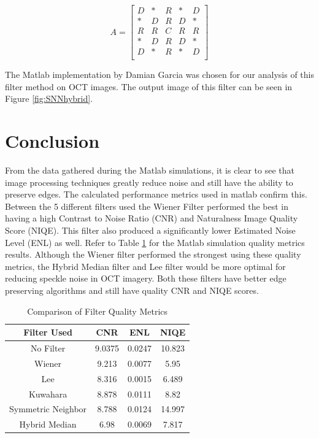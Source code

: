 \documentclass[%
reprint,
showpacs,preprintnumbers,
bibnotes,
amsmath,amssymb,
aps,
pra,
]{revtex4-1}
\begin{document}
$$
A =
\begin{bmatrix}
D & * & R & * & D\\
* & D & R & D & *\\
R & R & C & R & R\\
* & D & R & D & *\\
D & * & R & * & D\\
\end{bmatrix}
$$



The Matlab implementation by Damian Garcia was chosen for our analysis of this filter method on OCT images\cite{garcia_hybrid_2010}. The output image of this filter can be seen in Figure \ref{fig:SNNhybrid}.
\section{\label{sec:level1} Conclusion}
From the data gathered during the Matlab simulations, it is clear to see that image processing techniques greatly reduce noise and still have the ability to preserve edges. The calculated performance metrics used in matlab confirm this. Between the 5 different filters used the Wiener Filter performed the best in having a high Contrast to Noise Ratio (CNR) and Naturalness Image Quality Score (NIQE). This filter also produced a significantly lower Estimated Noise Level (ENL) as well. Refer to Table \ref{tab:compare} for the Matlab simulation quality metrics results. Although the Wiener filter performed the strongest using these quality metrics, the Hybrid Median filter and Lee filter would be more optimal for reducing speckle noise in OCT imagery. Both these filters have better edge preserving algorithms and still have quality CNR and NIQE scores.

\begin{table}[]
  \begin{tabular}{|c|c|c|c|}
    \hline
    Filter Used & CNR & ENL & NIQE \\
    \hline
    No Filter & 9.0375 & 0.0247 & 10.823  \\
    \hline
    Wiener & 9.213 & 0.0077 & 5.95 \\
    \hline
    Lee & 8.316 & 0.0015 & 6.489 \\
    \hline
    Kuwahara & 8.878 & 0.0111 & 8.82 \\
    \hline
    Symmetric Neighbor & 8.788 & 0.0124 & 14.997\\
    \hline
    Hybrid Median  & 6.98 & 0.0069 & 7.817 \\
    \hline
  \end{tabular}
  \caption{Comparison of Filter Quality Metrics}
  \label{tab:compare}
\end{table}
\end{document}
